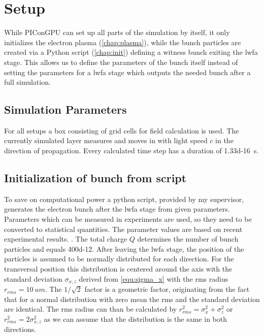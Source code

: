 \documentclass[bachelor_thesis]{subfiles}
\begin{document}
\chapter{Setup}
While PIConGPU can set up all parts of the simulation by itself, it only initializes the electron plasma (\autoref{chap:plasma}), while the bunch particles are created via a Python script (\autoref{chap:init}) defining a witness bunch exiting the \gls{lwfa} stage.
This allows us to define the parameters of the bunch itself instead of setting the parameters for a \gls{lwfa} stage which outputs the needed bunch after a full simulation.


\section{Simulation Parameters}
For all setups a box consisting of  grid cells for field calculation is used. The currently simulated layer measures  and moves in with light speed $c$ in the direction of propagation.
Every calculated time step has a duration of \qty{1.33d-16}{\s}. 


\section{Initialization of bunch from script}\label{chap:init}
To save on computational power a python script, provided by my supervisor, generates the electron bunch after the \gls{lwfa} stage from given parameters. Parameters which can be measured in experiments are used, 
so they need to be converted to statistical quantities. The parameter values are based on recent experimental results\cite{Kurz2021}. .
The total charge $Q$ determines the number of bunch particles and equals \qty{400d-12}{\C}. After leaving the \gls{lwfa} stage, the position of the particles is assumed to be normally distributed for each direction.
For the transversal position this distribution is centered around the axis with the standard deviation $\sigma_{x,z}$ derived from \autoref{equ:sigma_x} with the \gls{rms} radius $r_{rms}=\qty{10}{um}$.
The $1/\sqrt{2}$ factor is a geometric factor, originating from the fact that for a normal distribution with zero mean the \gls{rms} and the standard deviation are identical. 
The \gls{rms} radius can than be calculated by $r_{rms}^2=\sigma_{x}^2 + \sigma_{z}^2$ or  $r_{rms}^2=2\sigma_{x,z}^2$ as we can assume that the distribution is the same in both directions.
\end{document}
